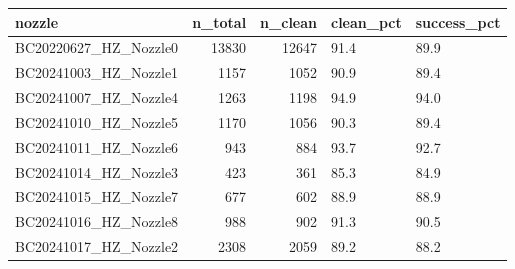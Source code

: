 \begin{tabular}{lrrll}
\toprule
nozzle & n\_total & n\_clean & clean\_pct & success\_pct \\
\midrule
BC20220627\_HZ\_Nozzle0 & 13830 & 12647 & 91.4 & 89.9 \\
BC20241003\_HZ\_Nozzle1 & 1157 & 1052 & 90.9 & 89.4 \\
BC20241007\_HZ\_Nozzle4 & 1263 & 1198 & 94.9 & 94.0 \\
BC20241010\_HZ\_Nozzle5 & 1170 & 1056 & 90.3 & 89.4 \\
BC20241011\_HZ\_Nozzle6 & 943 & 884 & 93.7 & 92.7 \\
BC20241014\_HZ\_Nozzle3 & 423 & 361 & 85.3 & 84.9 \\
BC20241015\_HZ\_Nozzle7 & 677 & 602 & 88.9 & 88.9 \\
BC20241016\_HZ\_Nozzle8 & 988 & 902 & 91.3 & 90.5 \\
BC20241017\_HZ\_Nozzle2 & 2308 & 2059 & 89.2 & 88.2 \\
\bottomrule
\end{tabular}
